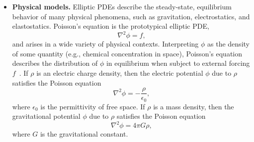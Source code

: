 \vspace{0.2em}
\begin{itemize}

\item \textbf{Physical models.} Elliptic PDEs describe the steady-state, equilibrium behavior of many physical phenomena, such as gravitation, electrostatics, and elastostatics. Poisson's equation is the prototypical elliptic PDE,
\[
\nabla^2 \phi = f,
\]
and arises in a wide variety of physical contexts. Interpreting $\phi$ as the density of some quantity (e.g., chemical concentration in space), Poisson's equation describes the distribution of $\phi$ in equilibrium when subject to external forcing $f$~\cite{Evans_10_01}. If $\rho$ is an electric charge density, then the electric potential $\phi$ due to $\rho$ satisfies the Poisson equation
\[
\nabla^2 \phi = -\frac{\rho}{\epsilon_0},
\]
where $\epsilon_0$ is the permittivity of free space. If $\rho$ is a mass density, then the gravitational potential $\phi$ due to $\rho$ satisfies the Poisson equation
\[
\nabla^2 \phi = 4\pi G \rho,
\]
where $G$ is the gravitational constant.


\end{itemize}
